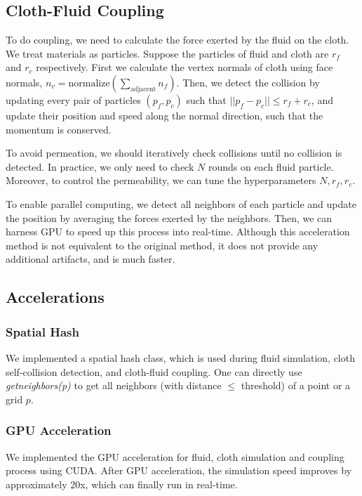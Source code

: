 \subsection{Cloth-Fluid Coupling}

To do coupling, we need to calculate the force exerted by the fluid on the cloth. We treat materials as particles. Suppose the particles of fluid and cloth are $r_f$ and $r_c$ respectively. First we calculate the vertex normals of cloth using face normals, $n_v=\text{normalize}(\sum_{\text{adjacent}} n_f)$. Then, we detect the collision by updating every pair of particles $(p_f,p_c)$ such that $||p_f-p_c||\le r_f+r_c$, and update their position and speed along the normal direction, such that the momentum is conserved.

To avoid permeation, we should iteratively check collisions until no collision is detected. In practice, we only need to check $N$ rounds on each fluid particle. Moreover, to control the permeability, we can tune the hyperparameters $N,r_f,r_c$.

To enable parallel computing, we detect all neighbors of each particle and update the position by averaging the forces exerted by the neighbors. Then, we can harness GPU to speed up this process into real-time. Although this acceleration method is not equivalent to the original method, it does not provide any additional artifacts, and is much faster.

\subsection{Accelerations}

\subsubsection{Spatial Hash} We implemented a spatial hash class, which is used during fluid simulation, cloth self-collision detection, and cloth-fluid coupling. One can directly use \textit{getneighbors(p)} to get all neighbors (with distance $\le $ threshold) of a point or a grid $p$.

\subsubsection{GPU Acceleration} We implemented the GPU acceleration for fluid, cloth simulation and coupling process using CUDA. After GPU acceleration, the simulation speed improves by approximately $20$x, which can finally run in real-time.

